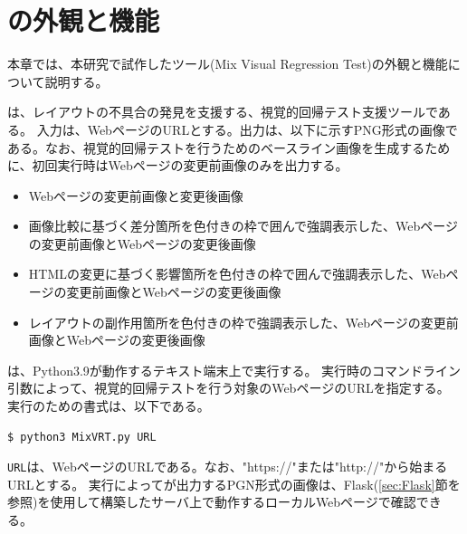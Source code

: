\chapter{ \toolName の外観と機能}\label{cha:Function}
本章では、本研究で試作したツール\toolName (Mix Visual Regression Test)の外観と機能について説明する。

\toolName は、レイアウトの不具合の発見を支援する、視覚的回帰テスト支援ツールである。
入力は、WebページのURLとする。出力は、以下に示すPNG形式の画像である。なお、視覚的回帰テストを行うためのベースライン画像を生成するために、\toolName 初回実行時はWebページの変更前画像のみを出力する。
\begin{itemize}
    \item Webページの変更前画像と変更後画像
    \item 画像比較に基づく差分箇所を色付きの枠で囲んで強調表示した、Webページの変更前画像とWebページの変更後画像
    \item HTMLの変更に基づく影響箇所を色付きの枠で囲んで強調表示した、Webページの変更前画像とWebページの変更後画像
    \item レイアウトの副作用箇所を色付きの枠で強調表示した、Webページの変更前画像とWebページの変更後画像
\end{itemize}

\toolName は、Python3.9\cite{Python}が動作するテキスト端末上で実行する。
\toolName 実行時のコマンドライン引数によって、視覚的回帰テストを行う対象のWebページのURLを指定する。
\toolName 実行のための書式は、以下である。
\begin{lstlisting}[label=list:command,frame=none,numbers=none,basicstyle={\normalsize \ttfamily \color[gray]{.15}}]
  $ python3 MixVRT.py URL
 \end{lstlisting}
{\tt URL}は、WebページのURLである。なお、"https://"または"http://"から始まるURLとする。
\toolName 実行によって\toolName が出力するPGN形式の画像は、Flask(\ref{sec:Flask}節を参照)を使用して構築したサーバ上で動作するローカルWebページで確認できる。


